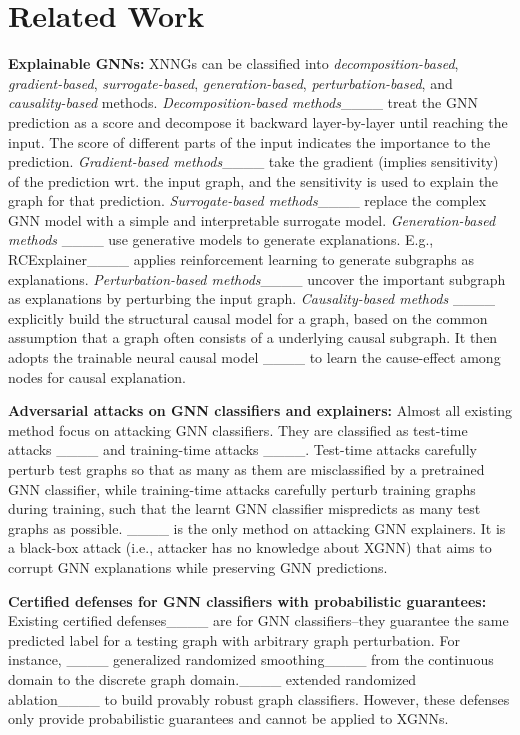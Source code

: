 \section{Related Work}
\label{sec:related}

\vspace{-2mm}
{\bf Explainable GNNs:} XNNGs can be classified into \textit{decomposition-based}, \textit{gradient-based},  \textit{surrogate-based}, \textit{generation-based},  \textit{perturbation-based}, and \textit{causality-based} methods. \textit{Decomposition-based methods}____ treat the GNN prediction  as a score and decompose it backward layer-by-layer until reaching the input. The score of different parts of the input indicates the importance to the prediction. 
\textit{Gradient-based methods}____ 
take the gradient (implies sensitivity) of the prediction wrt. the input graph, and the sensitivity is used to explain the graph for that prediction.
\textit{Surrogate-based methods}____ replace the complex GNN model with a simple and interpretable surrogate model.
\textit{Generation-based methods} 
____
use generative models to generate explanations. 
E.g., RCExplainer____ 
applies reinforcement learning to generate subgraphs as explanations. 
\textit{Perturbation-based methods}____
uncover the important subgraph as explanations by perturbing the input graph. 
\emph{Causality-based methods} ____ explicitly build the structural causal model for a graph, based on the common assumption that a graph often consists of a underlying causal  subgraph. It then adopts the trainable neural causal model ____ to learn the cause-effect among nodes for causal explanation. 



{\bf Adversarial attacks on GNN classifiers and explainers:}
Almost all existing method  focus on attacking GNN classifiers. 
 They are classified as test-time attacks
____ and training-time attacks
____. 
Test-time attacks carefully perturb test graphs  
so that as many as them are misclassified by a pretrained GNN classifier, 
while training-time attacks carefully perturb training graphs during training, such that the learnt GNN classifier mispredicts as many test graphs as possible. 
____ is the only method on attacking GNN explainers.  
It is a black-box attack (i.e., attacker has no knowledge about XGNN) that aims to corrupt GNN explanations while preserving GNN predictions.

{\bf Certified defenses for GNN classifiers with probabilistic guarantees:} Existing certified defenses____ are for GNN classifiers--they guarantee the same predicted label for a testing graph with arbitrary graph perturbation. 
For instance,
____  generalized randomized smoothing____ from the continuous domain to the discrete graph domain.____ extended randomized ablation____ to build provably robust graph classifiers. 
However, these defenses only provide probabilistic guarantees and cannot be applied to XGNNs.

